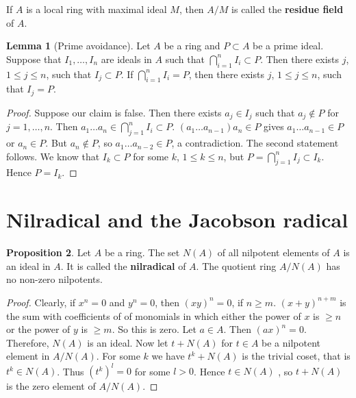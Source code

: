 \documentclass{article}
\newcommand{\rb}[1]{\left( #1 \right)}
\theoremstyle{definition}\newtheorem{definition}{Definition}[section]
\theoremstyle{definition}\newtheorem{remark}[definition]{Remark}
\theoremstyle{definition}\newtheorem*{example}{Example}
\theoremstyle{definition}\newtheorem*{note}{Note}
\newtheorem{proposition}[definition]{Proposition}
\newtheorem{lemma}[definition]{Lemma}
\begin{document}
If $ A $ is a local ring with maximal ideal $ M $, then $ A / M $ is called the \textbf{residue field} of $ A $.

\begin{lemma}[Prime avoidance]
\label{lem:4.12}
Let $ A $ be a ring and $ P \subset A $ be a prime ideal. Suppose that $ I_1, \dots, I_n $ are ideals in $ A $ such that $ \bigcap_{i = 1}^n I_i \subset P $. Then there exists $ j $, $ 1 \le j \le n $, such that $ I_j \subset P $. If $ \bigcap_{i = 1}^n I_i = P $, then there exists $ j $, $ 1 \le j \le n $, such that $ I_j = P $.
\end{lemma}

\begin{proof}
Suppose our claim is false. Then there exists $ a_j \in I_j $ such that $ a_j \notin P $ for $ j = 1, \dots, n $. Then $ a_1 \dots a_n \in \bigcap_{j = 1}^n I_i \subset P $. $ \rb{a_1 \dots a_{n - 1}}a_n \in P $ gives $ a_1 \dots a_{n - 1} \in P $ or $ a_n \in P $. But $ a_n \notin P $, so $ a_1 \dots a_{n - 2} \in P $, a contradiction. The second statement follows. We know that $ I_k \subset P $ for some $ k $, $ 1 \le k \le n $, but $ P = \bigcap_{j = 1}^n I_j \subset I_k $. Hence $ P = I_k $.
\end{proof}


\section{Nilradical and the Jacobson radical}

\begin{proposition}
Let $ A $ be a ring. The set $ N\rb{A} $ of all nilpotent elements of $ A $ is an ideal in $ A $. It is called the \textbf{nilradical} of $ A $. The quotient ring $ A / N\rb{A} $ has no non-zero nilpotents.
\end{proposition}

\begin{proof}
Clearly, if $ x^n = 0 $ and $ y^n = 0 $, then $ \rb{xy}^n = 0 $, if $ n \ge m $. $ \rb{x + y}^{n + m} $ is the sum with coefficients of of monomials in which either the power of $ x $ is $ \ge n $ or the power of $ y $ is $ \ge m $. So this is zero. Let $ a \in A $. Then $ \rb{ax}^n = 0 $. Therefore, $ N\rb{A} $ is an ideal. Now let $ t + N\rb{A} $ for $ t \in A $ be a nilpotent element in $ A / N\rb{A} $. For some $ k $ we have $ t^k + N\rb{A} $ is the trivial coset, that is $ t^k \in N\rb{A} $. Thus $ \rb{t^k}^l = 0 $ for some $ l > 0 $. Hence $ t \in N\rb{A} $ , so $ t + N\rb{A} $ is the zero element of $ A / N\rb{A} $.
\end{proof}
\end{document}
